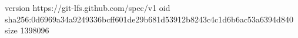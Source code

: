 version https://git-lfs.github.com/spec/v1
oid sha256:0d6969a34a9249336bcff601de29b681d53912b8243c4c1d6b6ac53a6394d840
size 1398096
